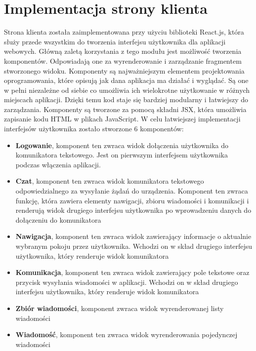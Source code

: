 \section{Implementacja strony klienta}
Strona klienta została zaimplementowana przy użyciu biblioteki React.js, która służy przede wszystkim do tworzenia interfejsu użytkownika dla aplikacji webowych. Główną zaletą korzystania z tego modułu jest możliwość tworzenia komponentów. Odpowiadają one za wyrenderowanie i zarządzanie fragmentem stworzonego widoku. Komponenty są najważniejszym elementem projektowania oprogramowania, które opisują jak dana aplikacja ma działać i wyglądać. Są one w pełni niezależne od siebie co umożliwia ich wielokrotne użytkowanie w różnych miejscach aplikacji. Dzięki temu kod staje się bardziej modularny i łatwiejszy do zarządzania. Komponenty są tworzone za pomocą składni JSX, która umożliwia zapisanie kodu HTML w plikach JavaScript. W celu łatwiejszej implementacji interfejsów użytkownika zostało stworzone 6 komponentów:
\begin{itemize}  
	\item \textbf{ Logowanie}, komponent ten zwraca widok dołączenia użytkownika do komunikatora tekstowego. Jest on pierwszym interfejsem użytkownika podczas włączenia aplikacji.
	\\
	\item \textbf{ Czat}, komponent ten zwraca widok komunikatora tekstowego odpowiedzialnego za wysyłanie żądań do urządzenia. Komponent ten zwraca funkcję, która zawiera elementy nawigacji, zbioru wiadomości i komunikacji i renderują widok drugiego interfejsu użytkownika po wprowadzeniu danych do dołączeniu do komunikatora
	\\
\item \textbf{ Nawigacja}, komponent ten zwraca widok zawierający informacje o aktualnie wybranym pokoju przez użytkownika. Wchodzi on w skład drugiego interfejsu użytkownika, który renderuje widok komunikatora
	\\
\item \textbf{ Komunikacja}, komponent ten zwraca widok zawierający pole tekstowe oraz przycisk wysyłania wiadomości w aplikacji. Wchodzi on w skład drugiego interfejsu użytkownika, który renderuje widok komunikatora
	\\
\item \textbf{ Zbiór wiadomości}, komponent zwraca widok wyrenderowanej listy wiadomości
	\\
\item \textbf{ Wiadomość}, komponent ten zwraca widok wyrenderowania pojedynczej wiadomości
	\\
\end{itemize}

